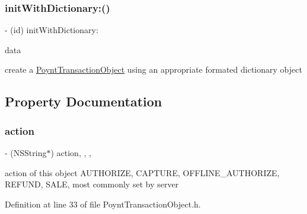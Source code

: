 \subsubsection{\texorpdfstring{init\+With\+Dictionary\+:()}{initWithDictionary:()}}
{\footnotesize\ttfamily -\/ (id) init\+With\+Dictionary\+: \begin{DoxyParamCaption}\item[{(N\+S\+Dictionary $\ast$)}]{data }\end{DoxyParamCaption}}



create a \hyperlink{interface_poynt_transaction_object}{Poynt\+Transaction\+Object} using an appropriate formated dictionary object 



\subsection{Property Documentation}
\hypertarget{interface_poynt_transaction_object_aaab84b2e5d0ad0f648e7e0e17c6afa08}{}\label{interface_poynt_transaction_object_aaab84b2e5d0ad0f648e7e0e17c6afa08} 
\subsubsection{\texorpdfstring{action}{action}}
{\footnotesize\ttfamily -\/ (N\+S\+String$\ast$) action\hspace{0.3cm}{\ttfamily [read]}, {\ttfamily [write]}, {\ttfamily [nonatomic]}, {\ttfamily [copy]}}



action of this object  \textquotesingle{}A\+U\+T\+H\+O\+R\+I\+ZE\textquotesingle{}, \textquotesingle{}C\+A\+P\+T\+U\+RE\textquotesingle{}, \textquotesingle{}O\+F\+F\+L\+I\+N\+E\+\_\+\+A\+U\+T\+H\+O\+R\+I\+ZE\textquotesingle{}, \textquotesingle{}R\+E\+F\+U\+ND\textquotesingle{}, \textquotesingle{}S\+A\+LE\textquotesingle{}, most commonly set by server 



Definition at line 33 of file Poynt\+Transaction\+Object.\+h.

\hypertarget{interface_poynt_transaction_object_a5ab449d070271ee2c9d138bb7b472a6c}{}\label{interface_poynt_transaction_object_a5ab449d070271ee2c9d138bb7b472a6c} 
